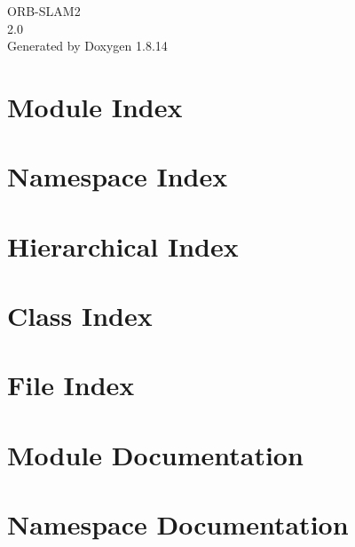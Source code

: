 \documentclass[twoside]{book}
\newcommand{\+}{\discretionary{\mbox{\scriptsize$\hookleftarrow$}}{}{}}
\newcommand{\clearemptydoublepage}{%
  \newpage{\pagestyle{empty}\cleardoublepage}%
}
\begin{document}
\hypersetup{pageanchor=false,
             bookmarksnumbered=true,
             pdfencoding=unicode
            }
\begin{titlepage}
\vspace*{7cm}
\begin{center}%
{\Large O\+R\+B-\/\+S\+L\+A\+M2 \\[1ex]\large 2.\+0 }\\
\vspace*{1cm}
{\large Generated by Doxygen 1.8.14}\\
\end{center}
\end{titlepage}
\clearemptydoublepage
{}
\tableofcontents
\clearemptydoublepage
{}
\hypersetup{pageanchor=true}

\chapter{Module Index}

\chapter{Namespace Index}

\chapter{Hierarchical Index}

\chapter{Class Index}

\chapter{File Index}

\chapter{Module Documentation}



\chapter{Namespace Documentation}







\end{document}
